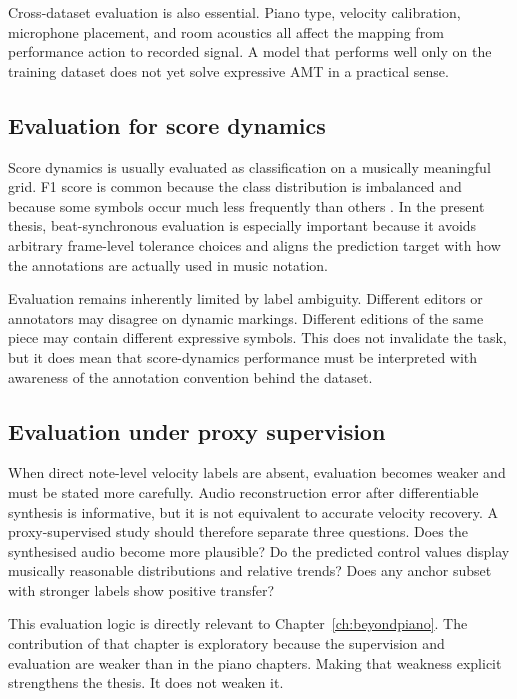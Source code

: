 Cross-dataset evaluation is also essential. Piano type, velocity calibration, microphone placement, and room acoustics all affect the mapping from performance action to recorded signal. A model that performs well only on the training dataset does not yet solve expressive AMT in a practical sense.

\subsection{Evaluation for score dynamics}
\label{sec:bg:dataeval:scoredyn}

Score dynamics is usually evaluated as classification on a musically meaningful grid. F1 score is common because the class distribution is imbalanced and because some symbols occur much less frequently than others \cite{kosta2017thesis}. In the present thesis, beat-synchronous evaluation is especially important because it avoids arbitrary frame-level tolerance choices and aligns the prediction target with how the annotations are actually used in music notation.

Evaluation remains inherently limited by label ambiguity. Different editors or annotators may disagree on dynamic markings. Different editions of the same piece may contain different expressive symbols. This does not invalidate the task, but it does mean that score-dynamics performance must be interpreted with awareness of the annotation convention behind the dataset.

\subsection{Evaluation under proxy supervision}
\label{sec:bg:dataeval:proxy}

When direct note-level velocity labels are absent, evaluation becomes weaker and must be stated more carefully. Audio reconstruction error after differentiable synthesis is informative, but it is not equivalent to accurate velocity recovery. A proxy-supervised study should therefore separate three questions. Does the synthesised audio become more plausible? Do the predicted control values display musically reasonable distributions and relative trends? Does any anchor subset with stronger labels show positive transfer?

This evaluation logic is directly relevant to Chapter~\ref{ch:beyondpiano}. The contribution of that chapter is exploratory because the supervision and evaluation are weaker than in the piano chapters. Making that weakness explicit strengthens the thesis. It does not weaken it.

